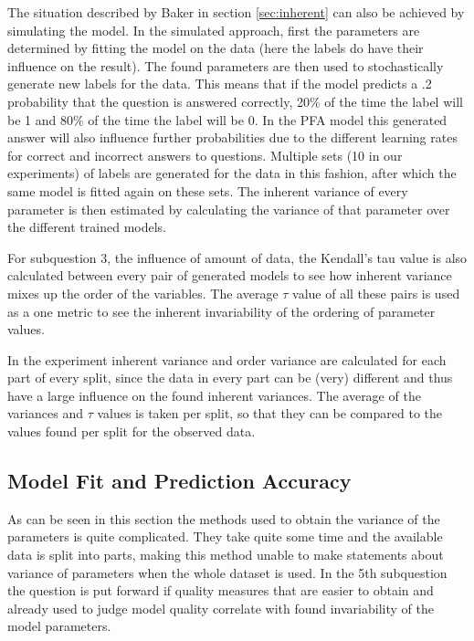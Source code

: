 \documentclass{scrartcl}
\begin{document}
The situation described by Baker in section \ref{sec:inherent} can also be achieved by simulating the model. In the simulated approach, first the parameters are determined by fitting the model on the data (here the labels do have their influence on the result). The found parameters are then used to stochastically generate new labels for the data. This means that if the model predicts a .2 probability that the question is answered correctly, 20\% of the time the label will be 1 and 80\% of the time the label will be 0. In the PFA model this generated answer will also influence further probabilities due to the different learning rates for correct and incorrect answers to questions. Multiple sets (10 in our experiments) of labels are generated for the data in this fashion, after which the same model is fitted again on these sets. The inherent variance of every parameter is then estimated by calculating the variance of that parameter over the different trained models.

For subquestion 3, the influence of amount of data, the Kendall's tau value is also calculated between every pair of generated models to see how inherent variance mixes up the order of the variables. The average $\tau$ value of all these pairs is used as a one metric to see the inherent invariability of the ordering of parameter values. 

In the experiment inherent variance and order variance are calculated for each part of every split, since the data in every part can be (very) different and thus have a large influence on the found inherent variances. The average of the variances and $\tau$ values is taken per split, so that they can be compared to the values found per split for the observed data. 

\subsection{Model Fit and Prediction Accuracy}
\label{sec:perf}
As can be seen in this section the methods used to obtain the variance of the parameters is quite complicated. They take quite some time and the available data is split into parts, making this method unable to make statements about variance of parameters when the whole dataset is used. In the 5th subquestion the question is put forward if quality measures that are easier to obtain and already used to judge model quality correlate with found invariability of the model parameters.
\end{document}
